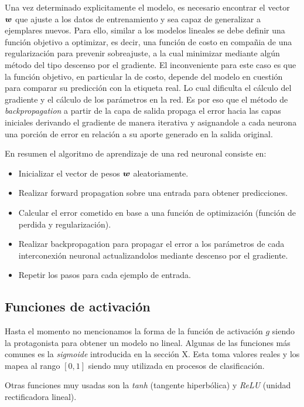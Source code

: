 Una vez determinado explicitamente el modelo, es necesario encontrar el vector
$\boldsymbol{w}$ que ajuste a los datos de entrenamiento y sea capaz de generalizar a
ejemplares nuevos. Para ello, similar a los modelos lineales se debe definir una
función objetivo a optimizar, es decir, una función de costo en compañia de una
regularización para prevenir sobreajuste, a la cual minimizar mediante algún
método del tipo descenso por el gradiente. El inconveniente para este caso es
que la función objetivo, en particular la de costo, depende del modelo en
cuestión para comparar su predicción con la etiqueta real. Lo cual dificulta el
cálculo del gradiente y el cálculo de los parámetros en la red. Es por eso que
el método de \emph{backpropagation} a partir de la capa de salida propaga el
error hacia las capas iniciales derivando el gradiente de manera iterativa y
asignandole a cada neurona una porción de error en relación a su aporte generado
en la salida original.

En resumen el algoritmo de aprendizaje de una red neuronal consiste en:

\begin{itemize}
    \item Inicializar el vector de pesos $\boldsymbol{w}$ aleatoriamente.
    \item Realizar forward propagation sobre una entrada para obtener
    predicciones.
    \item Calcular el error cometido en base a una función de optimización
    (función de perdida y regularización).
    \item Realizar backpropagation para propagar el error a los parámetros de
    cada interconexión neuronal actualizandolos mediante descenso por el gradiente.
    \item Repetir los pasos para cada ejemplo de entrada.
\end{itemize}

\subsection{Funciones de activación}

Hasta el momento no mencionamos la forma de la función de activación $g$ siendo
la protagonista para obtener un modelo no lineal. Algunas de las funciones más
comunes es la \emph{sigmoide} introducida en la sección X. Esta toma valores
reales y los mapea al rango $[0, 1]$ siendo muy utilizada en procesos de
clasificación.

Otras funciones muy usadas son la \emph{tanh} (tangente hiperbólica) y
\emph{ReLU} (unidad rectificadora lineal).

